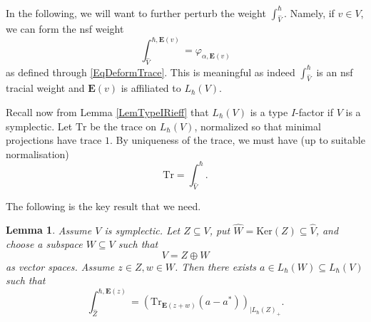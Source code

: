 \documentclass[11pt, reqno]{amsart}
\newtheorem{lemma}[theorem]{Lemma}
\theoremstyle{definition}
\numberwithin{equation}{section}
\newcommand{\eb}{\mathbf{E}}
\newcommand{\Eb}{\mathbf{E}}
\newcommand{\Tr}{\mathrm{Tr}}
\newcommand{\Ker}{\mathrm{Ker}}
\begin{document}
In the following, we will want to further perturb the weight $\int_{\hat{V}}^{\hbar}$. Namely, if $v\in V$, we can form the nsf weight
\[
\int_{\hat{V}}^{\hbar,\eb(v)} = \varphi_{\alpha,\eb(v)}
\]
as defined through \eqref{EqDeformTrace}. This is meaningful as indeed $\int_{\hat{V}}^{\hbar}$ is an nsf tracial weight and $\eb(v)$ is affiliated to $L_{\hbar}(V)$. 
 
Recall now from Lemma \ref{LemTypeIRieff} that $L_{\hbar}(V)$ is a type $I$-factor if $V$ is a symplectic. Let $\Tr$ be the trace on $L_{\hbar}(V)$, normalized so that minimal projections have trace $1$. By uniqueness of the trace, we must have (up to suitable normalisation) 
\[
\Tr = \int_{\hat{V}}^{\hbar}.
\]

The following is the key result that we need.
\begin{lemma}\label{LemInvWeightQT}
Assume $V$ is symplectic. Let $Z \subseteq V$, put $\hat{W} = \Ker(Z) \subseteq \hat{V}$, and choose a subspace $W \subseteq V$ such that
\[
V = Z\oplus W
\]
as vector spaces. Assume $z\in Z,w\in W$. Then there exists $a \in L_{\hbar}(W) \subseteq L_{\hbar}(V)$ such that  
\begin{equation}\label{EqFact}
\int_{\hat{Z}}^{\hbar,\eb(z)} =  \left(\Tr_{\Eb(z+w)}(a-a^*)\right)_{\mid L_{\hbar}(Z)_+}.
\end{equation}
\end{lemma} 
\end{document}
